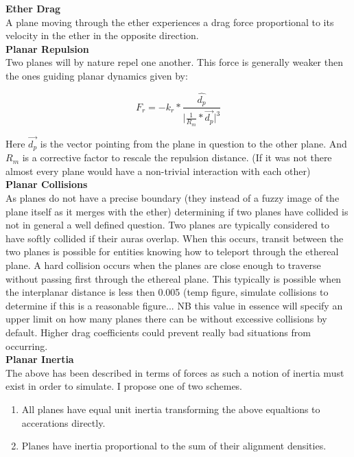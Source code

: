 \documentclass[10pt]{article}
\begin{document}
\noindent\textbf{Ether Drag}\\
A plane moving through the ether experiences a drag force proportional to its velocity in the ether in the opposite direction.\\

\noindent\textbf{Planar Repulsion}\\
Two planes will by nature repel one another. This force is generally weaker then the ones guiding planar dynamics given by:

\[
F_r = -k_r*\frac{\hat{d_p}}{\vert\frac{1}{R_m}*\overrightarrow{d_p}\vert^3}
\]

Here $\overrightarrow{d_p}$ is the vector pointing from the plane in question to the other plane. And $R_m$ is a corrective factor to rescale the repulsion distance. (If it was not there almost every plane would have a non-trivial interaction with each other)\\

\noindent\textbf{Planar Collisions}\\
As planes do not have a precise boundary (they instead of a fuzzy image of the plane itself as it merges with the ether) determining if two planes have collided is not in general a well defined question. Two planes are typically considered to have softly collided if their auras overlap. When this occurs, transit between the two planes is possible for entities knowing how to teleport through the ethereal plane. A hard collision occurs when the planes are close enough to traverse without passing first through the ethereal plane. This typically is possible when the interplanar distance is less then 0.005 (temp figure, simulate collisions to determine if this is a reasonable figure... NB this value in essence will specify an upper limit on how many planes there can be without excessive collisions by default. Higher drag coefficients could prevent really bad situations from occurring.\\

\noindent\textbf{Planar Inertia}\\
The above has been described in terms of forces as such a notion of inertia must exist in order to simulate. I propose one of two schemes.

\begin{enumerate}
\item All planes have equal unit inertia transforming the above equaltions to accerations directly.
\item Planes have inertia proportional to the sum of their alignment densities. 
\end{enumerate}
\end{document}
